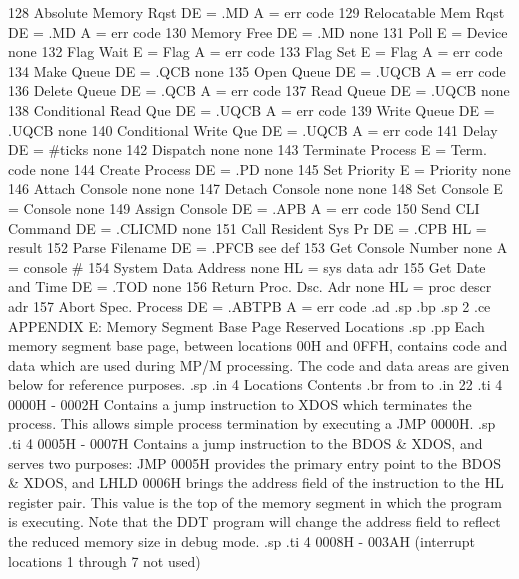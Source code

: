 128  Absolute Memory Rqst  DE = .MD          A = err code
129  Relocatable Mem Rqst  DE = .MD          A = err code
130  Memory Free           DE = .MD          none
131  Poll                  E = Device        none
132  Flag Wait             E = Flag          A = err code
133  Flag Set              E = Flag          A = err code
134  Make Queue            DE = .QCB         none
135  Open Queue            DE = .UQCB        A = err code
136  Delete Queue          DE = .QCB         A = err code
137  Read Queue            DE = .UQCB        none
138  Conditional Read Que  DE = .UQCB        A = err code
139  Write Queue           DE = .UQCB        none
140  Conditional Write Que DE = .UQCB        A = err code
141  Delay                 DE = #ticks       none
142  Dispatch              none              none
143  Terminate Process     E = Term. code    none
144  Create Process        DE = .PD          none
145  Set Priority          E = Priority      none
146  Attach Console        none              none
147  Detach Console        none              none
148  Set Console           E = Console       none
149  Assign Console        DE = .APB         A = err code
150  Send CLI Command      DE = .CLICMD      none
151  Call Resident Sys Pr  DE = .CPB         HL = result
152  Parse Filename        DE = .PFCB        see def
153  Get Console Number    none              A = console #
154  System Data Address   none              HL = sys data adr
155  Get Date and Time     DE = .TOD         none
156  Return Proc. Dsc. Adr none              HL = proc descr adr
157  Abort Spec. Process   DE = .ABTPB       A = err code
.ad
.sp
.bp
.sp 2
.ce
APPENDIX E:  Memory Segment Base Page Reserved Locations
.sp
.pp
Each memory segment base page, between locations 00H and 0FFH, contains
code and data which are used during MP/M
processing.  The code and data areas are given below for reference purposes.
.sp
.in 4
Locations                              Contents
.br
from     to
.in 22
.ti 4
0000H - 0002H     Contains a jump instruction to XDOS which terminates
the process.  This allows simple process termination by executing a
JMP 0000H.
.sp
.ti 4
0005H - 0007H     Contains a jump instruction to the BDOS & XDOS, and serves
two purposes:  JMP 0005H provides the primary entry point to the
BDOS & XDOS, and LHLD
0006H brings the address field of the instruction to the HL register
pair.  This value is the top of the memory segment in which the
program is executing.  Note that the DDT program
will change the address field to reflect the reduced memory size in
debug mode.
.sp
.ti 4
0008H - 003AH     (interrupt locations 1 through 7 not used)
